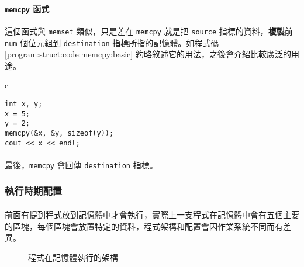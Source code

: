 \documentclass[12pt,a4paper,oneside]{article}
\begin{document}
\begin{CJK}{UTF8}{bkai}
\paragraph{\lstinline!memcpy! 函式}這個函式與 \lstinline!memset! 類似，只是差在 \lstinline!memcpy! 就是把 \lstinline!source! 指標的資料，{\color{blue}\textbf{複製}}前 \lstinline!num! 個位元組到 \lstinline!destination! 指標所指的記憶體。如程式碼 \ref{program:struct:code:memcpy:basic} 約略敘述它的用法，之後會介紹比較廣泛的用途。

\begin{code}[h!]
\centering
\begin{tabular}{c}
\begin{lstlisting}
int x, y;
x = 5;
y = 2;
memcpy(&x, &y, sizeof(y));
cout << x << endl;
\end{lstlisting}
\end{tabular}
\caption{\lstinline!memcpy! 用法}
\label{program:struct:code:memcpy:basic}
\end{code}

\paragraph{}最後，\lstinline!memcpy! 會回傳 \lstinline!destination! 指標。

\subsubsection{執行時期配置}

\paragraph{}前面有提到程式放到記憶體中才會執行，實際上一支程式在記憶體中會有五個主要的區塊，每個區塊會放置特定的資料，程式架構和配置會因作業系統不同而有差異。

\begin{figure}[h!]
\centering
{}
\caption{程式在記憶體執行的架構}
\label{program:struct:fig:program}
\end{figure}


\end{CJK}
\end{document}
